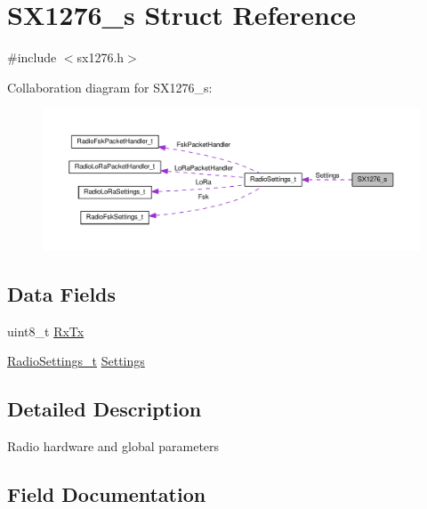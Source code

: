 \hypertarget{structSX1276__s}{}\section{S\+X1276\+\_\+s Struct Reference}
\label{structSX1276__s}


{\ttfamily \#include $<$sx1276.\+h$>$}



Collaboration diagram for S\+X1276\+\_\+s\+:
\nopagebreak
\begin{figure}[H]
\begin{center}
\leavevmode
\includegraphics[width=350pt]{structSX1276__s__coll__graph}
\end{center}
\end{figure}
\subsection*{Data Fields}
\begin{DoxyCompactItemize}
\item 
uint8\+\_\+t \hyperlink{structSX1276__s_abef47b886ad9300944015058c8255411}{Rx\+Tx}
\item 
\hyperlink{structRadioSettings__t}{Radio\+Settings\+\_\+t} \hyperlink{structSX1276__s_aacf7afe5f1c4e05bc4822255dc8a123c}{Settings}
\end{DoxyCompactItemize}


\subsection{Detailed Description}
Radio hardware and global parameters 

\subsection{Field Documentation}
\mbox{\label{structSX1276__s_abef47b886ad9300944015058c8255411}} 
